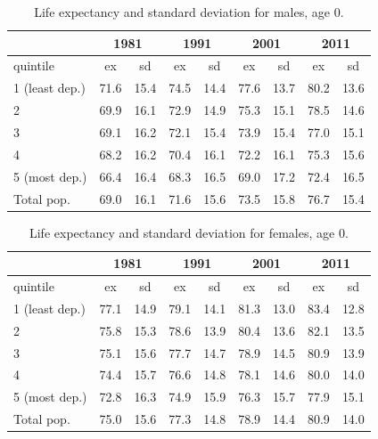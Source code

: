 \documentclass[12pt,oneside,a4paper]{article} %
\theoremstyle{definition}
\begin{document}
\begin{table}[htbp]
  \centering
  \caption{Life expectancy and standard deviation for males, age 0.}
  \label{tab:LESD0m} %
    \begin{tabular}{lrrrrrrrr}
          & \multicolumn{2}{c}{1981} & \multicolumn{2}{c}{1991} & \multicolumn{2}{c}{2001} & \multicolumn{2}{c}{2011} \\
    \midrule
    quintile & \multicolumn{1}{c}{ex} & \multicolumn{1}{c}{sd} & \multicolumn{1}{c}{ex} & \multicolumn{1}{c}{sd} & \multicolumn{1}{c}{ex} & \multicolumn{1}{c}{sd} & \multicolumn{1}{c}{ex} & \multicolumn{1}{c}{sd} \\
    \midrule
    1 (least dep.) & 71.6  & 15.4  & 74.5  & 14.4  & 77.6  & 13.7  & 80.2  & 13.6 \\
    2     & 69.9  & 16.1  & 72.9  & 14.9  & 75.3  & 15.1  & 78.5  & 14.6 \\
    3     & 69.1  & 16.2  & 72.1  & 15.4  & 73.9  & 15.4  & 77.0  & 15.1 \\
    4     & 68.2  & 16.2  & 70.4  & 16.1  & 72.2  & 16.1  & 75.3  & 15.6 \\
    5 (most dep.) & 66.4  & 16.4  & 68.3  & 16.5  & 69.0  & 17.2  & 72.4  & 16.5 \\
    Total pop. & 69.0  & 16.1  & 71.6  & 15.6  & 73.5  & 15.8  & 76.7  & 15.4 \\
    \bottomrule
    \end{tabular}%
  \label{tab:addlabel}%
\end{table}%


\begin{table}[htbp]
  \centering
  \caption{Life expectancy and standard deviation for females, age 0.}
   \label{tab:LESD0f}
    \begin{tabular}{lrrrrrrrr}
          & \multicolumn{2}{c}{1981} & \multicolumn{2}{c}{1991} & \multicolumn{2}{c}{2001} & \multicolumn{2}{c}{2011} \\
    \midrule
    quintile & \multicolumn{1}{c}{ex} & \multicolumn{1}{c}{sd} & \multicolumn{1}{c}{ex} & \multicolumn{1}{c}{sd} & \multicolumn{1}{c}{ex} & \multicolumn{1}{c}{sd} & \multicolumn{1}{c}{ex} & \multicolumn{1}{c}{sd} \\
    \midrule
    1 (least dep.) & 77.1  & 14.9  & 79.1  & 14.1  & 81.3  & 13.0  & 83.4  & 12.8 \\
    2     & 75.8  & 15.3  & 78.6  & 13.9  & 80.4  & 13.6  & 82.1  & 13.5 \\
    3     & 75.1  & 15.6  & 77.7  & 14.7  & 78.9  & 14.5  & 80.9  & 13.9 \\
    4     & 74.4  & 15.7  & 76.6  & 14.8  & 78.1  & 14.6  & 80.0  & 14.0 \\
    5 (most dep.) & 72.8  & 16.3  & 74.9  & 15.9  & 76.3  & 15.7  & 77.9  & 15.1 \\
    Total pop. & 75.0  & 15.6  & 77.3  & 14.8  & 78.9  & 14.4  & 80.9  & 14.0 \\
    \bottomrule
    \end{tabular}%
  \label{tab:addlabel}%
\end{table}%
\end{document}
